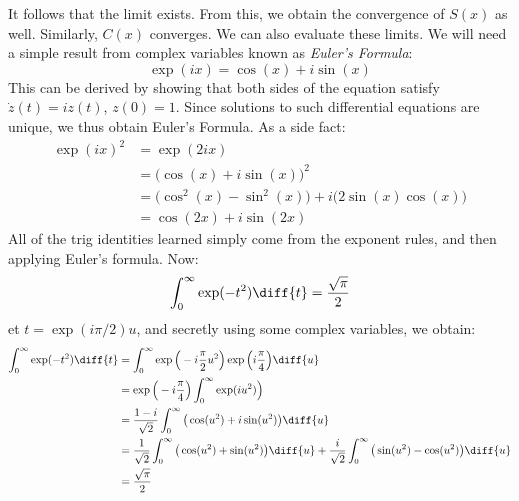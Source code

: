 \documentclass[crop=false,class=book,oneside]{standalone}
\begin{document}
            It follows that the limit exists. From this, we obtain
            the convergence of $S(x)$ as well. Similarly, $C(x)$
            converges. We can also evaluate these limits. We will
            need a simple result from complex variables known as
            \textit{Euler's Formula}:
            \begin{equation}
                \exp(ix)=\cos(x)+i\sin(x)
            \end{equation}
            This can be derived by showing that both sides of the
            equation satisfy $\dot{z}(t)=iz(t)$, $z(0)=1$. Since
            solutions to such differential equations are unique,
            we thus obtain Euler's Formula. As a side fact:
            \begin{align}
                \exp(ix)^{2}&=\exp(2ix)\\
                &=\big(\cos(x)+i\sin(x)\big)^{2}\\
                &=\big(\cos^{2}(x)-\sin^{2}(x)\big)+
                i\big(2\sin(x)\cos(x)\big)\\
                &=\cos(2x)+i\sin(2x)
            \end{align}
            All of the trig identities learned simply come from
            the exponent rules, and then applying Euler's formula.
            Now:
            \begin{equation}
                \int_{0}^{\infty}\exp(-t^{2})\diff{t}
                =\frac{\sqrt{\pi}}{2}
            \end{equation}
            et $t=\exp(i\pi/2)u$, and secretly using some complex
            variables, we obtain:
            \begin{align}
                \int_{0}^{\infty}\exp(-t^{2})\diff{t}
                &=\int_{0}^{\infty}
                \exp\Big(-i\frac{\pi}{2}u^{2}\Big)
                \exp\Big(i\frac{\pi}{4}\Big)\diff{u}\\
                &=\exp\Big(-i\frac{\pi}{4}\Big)
                \int_{0}^{\infty}\exp(iu^{2})\Big)\\
                &=\frac{1-i}{\sqrt{2}}\int_{0}^{\infty}
                \big(\cos(u^{2})+i\sin(u^{2})\big)\diff{u}\\
                &=\frac{1}{\sqrt{2}}\int_{0}^{\infty}
                \big(\cos(u^{2})+\sin(u^{2})\big)\diff{u}
                +\frac{i}{\sqrt{2}}\int_{0}^{\infty}
                \big(\sin(u^{2})-\cos(u^{2})\big)\diff{u}\\
                &=\frac{\sqrt{\pi}}{2}
            \end{align}
\end{document}
